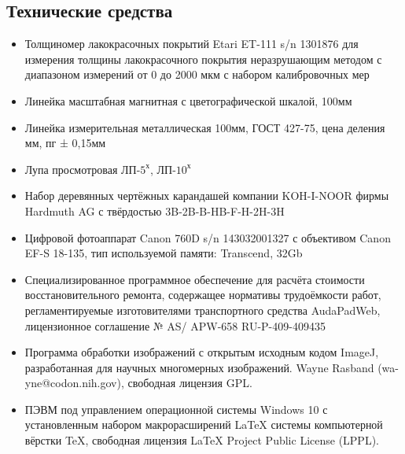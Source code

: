 \subsection{Технические средства}  %
\begin{itemize}
%
\item Толщиномер лакокрасочных покрытий Etari ET-111 s/n 1301876 для измерения толщины лакокрасочного покрытия неразрушающим методом с диапазоном измерений от 0 до 2000 мкм с набором калибровочных мер
\item   Линейка масштабная магнитная с цветографической шкалой, 100мм
\item   Линейка измерительная металлическая 100мм, ГОСТ 427-75, цена деления мм, пг ± 0,15мм
\item  Лупа просмотровая ЛП-$ 5^х $, ЛП-$ 10^х $ 
\item Набор деревянных чертёжных карандашей компании KOH-I-NOOR фирмы Hardmuth AG с твёрдостью 3B-2B-B-HB-F-H-2H-3H
\item 	Цифровой фотоаппарат Canon 760D s/n 143032001327 с объективом Canon EF-S 18-135, тип используемой памяти: Transcend,  32Gb
\item  Специализированное программное обеспечение для расчёта стоимости  восстановительного ремонта, содержащее нормативы трудоёмкости работ, регламентируемые изготовителями транспортного средства     AudaPadWeb, лицензионное соглашение № AS/\- APW-658  RU-P-409-409435
\item  Программа обработки изображений с открытым исходным кодом ImageJ, разработанная для научных многомерных изображений.  Wayne Rasband (wa-yne@codon.nih.gov),
свободная лицензия GPL.
\item  ПЭВМ под управлением операционной системы Windows 10 с установленным набором макрорасширений LaTeX системы компьютерной вёрстки TeX, свободная лицензия LaTeX Project Public License (LPPL). 
%	
\end{itemize}
